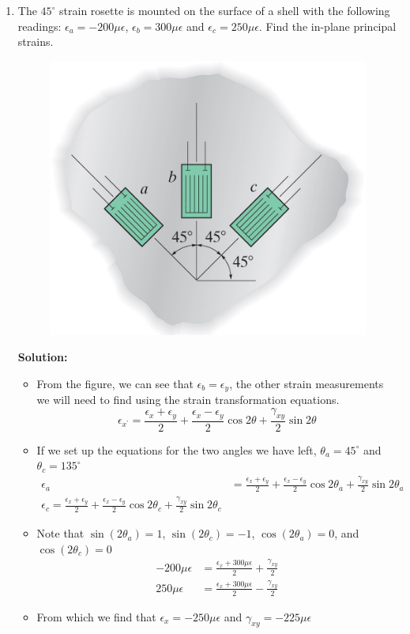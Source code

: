 \documentclass[12pt, oneside]{article}
\begin{document}
\begin{enumerate}
	\item %
		The $45^\circ$ strain rosette is mounted on the surface of a shell with the following readings: $\epsilon_a = -200 \mu \epsilon$, $\epsilon_b = 300 \mu \epsilon$ and $\epsilon_c = 250 \mu \epsilon$.
		Find the in-plane principal strains.
		\begin{figure}[H]
			\centering
			\includegraphics[width=0.6\linewidth]{10-25}
		\end{figure}
			\textbf{Solution:}
			\begin{itemize}
				\item From the figure, we can see that $\epsilon_b = \epsilon_y$, the other strain measurements we will need to find using the strain transformation equations.
					\[\epsilon_{x^\prime} = \frac{\epsilon_x+\epsilon_y}{2} + \frac{\epsilon_x-\epsilon_y}{2} \cos 2\theta + \frac{\gamma_{xy}}{2} \sin 2\theta \]
				\item If we set up the equations for the two angles we have left, $\theta_a = 45^\circ$ and $\theta_c = 135^\circ$
					\[ \begin{aligned}
						\epsilon_{a} &= \frac{\epsilon_x+\epsilon_y}{2} + \frac{\epsilon_x-\epsilon_y}{2} \cos 2\theta_a + \frac{\gamma_{xy}}{2} \sin 2\theta_a \\
					\epsilon_{c} = \frac{\epsilon_x+\epsilon_y}{2} + \frac{\epsilon_x-\epsilon_y}{2} \cos 2\theta_c + \frac{\gamma_{xy}}{2} \sin 2\theta_c 
					\end{aligned}\]
				\item Note that $\sin(2\theta_a)=1$, $\sin(2\theta_c)=-1$, $\cos(2\theta_a)=0$, and $\cos(2\theta_c)=0$
					\[ \begin{aligned}
						-200 \mu \epsilon &= \frac{\epsilon_x+300 \mu \epsilon}{2} + \frac{\gamma_{xy}}{2} \\
						250 \mu \epsilon &= \frac{\epsilon_x+300 \mu \epsilon}{2} - \frac{\gamma_{xy}}{2} 
					\end{aligned}\]
				\item From which we find that $\epsilon_x = -250 \mu \epsilon$ and $\gamma_{xy} = -225 \mu \epsilon$
			\end{itemize}


\end{enumerate}
\end{document}
